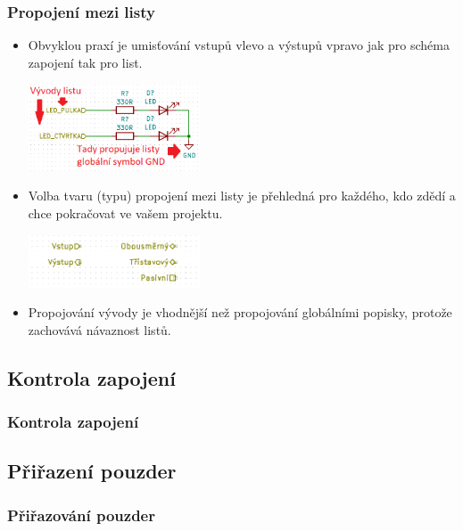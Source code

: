 \documentclass{beamer}
\begin{document}
\begin{frame}
	\frametitle{Propojení mezi listy}
	\small
	\begin{itemize}
		\item Obvyklou praxí je umisťování vstupů vlevo a výstupů vpravo jak pro schéma zapojení tak pro list.
			\begin{center}
				\includegraphics[width=0.4\textwidth]{obr/dalsi_strana07.png}
			\end{center}
		\item Volba tvaru (typu) propojení mezi listy je přehledná pro každého, kdo zdědí a chce pokračovat ve vašem projektu.
			\begin{center}
				\includegraphics[width=0.4\textwidth]{obr/dalsi_strana08.png}
			\end{center}
		\item Propojování vývody je vhodnější než propojování globálními popisky, protože zachovává návaznost listů.
	\end{itemize}
	
\end{frame}



\subsection{\texorpdfstring{Kontrola zapojení}{Kontrola zapojeni}}
\begin{frame}
	\frametitle{Kontrola zapojení}
		
\end{frame}


\subsection{\texorpdfstring{Přiřazení pouzder}{Prirazeni pouzder}}
\begin{frame}
	\frametitle{Přiřazování pouzder}
		
\end{frame}

  
\end{document}
